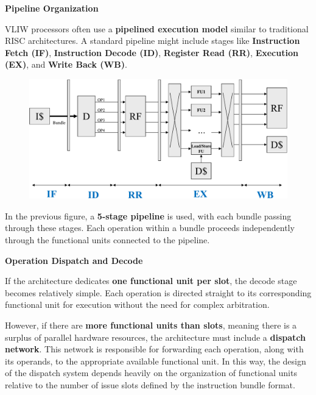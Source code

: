 \highspace
\begin{flushleft}
    \textcolor{Green3}{ \textbf{Pipeline Organization}}
\end{flushleft}
VLIW processors often use a \textbf{pipelined execution model} similar to traditional RISC architectures. A standard pipeline might include stages like \textbf{Instruction Fetch (IF)}, \textbf{Instruction Decode (ID)}, \textbf{Register Read (RR)}, \textbf{Execution (EX)}, and \textbf{Write Back (WB)}.

\begin{figure}[!htp]
    \centering
    \includegraphics[width=\textwidth]{img/vliw-arch.pdf}
\end{figure}

\highspace
In the previous figure, a \textbf{5-stage pipeline} is used, with each bundle passing through these stages. Each operation within a bundle proceeds independently through the functional units connected to the pipeline.

\newpage

\begin{flushleft}
    \textcolor{Green3}{ \textbf{Operation Dispatch and Decode}}
\end{flushleft}
If the architecture dedicates \textbf{one functional unit per slot}, the decode stage becomes relatively simple. Each operation is directed straight to its corresponding functional unit for execution without the need for complex arbitration.

\highspace
However, if there are \textbf{more functional units than slots}, meaning there is a surplus of parallel hardware resources, the architecture must include a \textbf{dispatch network}. This network is responsible for forwarding each operation, along with its operands, to the appropriate available functional unit. In this way, the design of the dispatch system depends heavily on the organization of functional units relative to the number of issue slots defined by the instruction bundle format.
